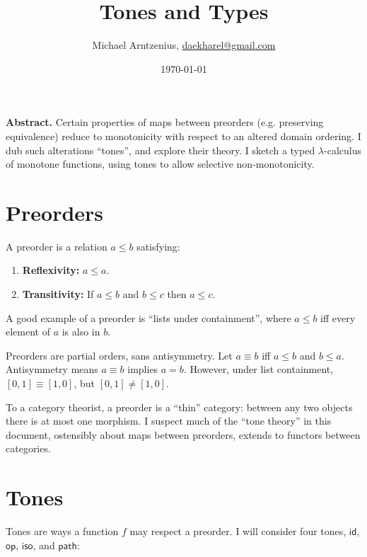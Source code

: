 \documentclass[b5,wide,libertine,ribbons]{rntz}
\title{Tones and Types}
\author{Michael Arntzenius, %
  \href{mailto:daekharel@gmail.com}{daekharel@gmail.com}}
\date{\today}
\newcommand{\ms}[1]{\ensuremath{\mathsf{#1}}}
\newcommand{\id}{\ms{id}}
\newcommand{\op}{\ms{op}}
\newcommand{\iso}{\ms{iso}}     %
\renewcommand{\path}{\ms{path}} %
\newcommand{\tm}{\id}                   %
\newcommand{\ta}{{\color{ACMGreen}\op}} %
\newcommand{\ti}{{\color{ACMBlue}\iso}} %
\newcommand{\tb}{{\color{ACMRed}\path}} %
\renewcommand{\ta}{{\color{ForestGreen}\op}}   %
\renewcommand{\ti}{{\color{NavyBlue}\iso}}     %
\renewcommand{\tb}{{\color{Bittersweet}\path}} %
\begin{document}
\maketitle

{\vspace{1em}%
\textbf{Abstract.}
%
 Certain properties of maps between preorders (e.g.\! preserving equivalence)
 reduce to monotonicity with respect to an altered domain ordering. I dub such
 alterations ``tones'', and explore their theory. I sketch a typed
 $\lambda$-calculus of monotone functions, using tones to allow selective
 non-mono\-tonicity. \par}

\section{Preorders}

A preorder is a relation $a \le b$ satisfying:
\begin{enumerate}
\item \textbf{Reflexivity:} $a \le a$.
\item \textbf{Transitivity:} If $a \le b$ and $b \le c$ then $a \le c$.
\end{enumerate}

A good example of a preorder is ``lists under containment'', where $a \le b$ iff
every element of $a$ is also in $b$.

Preorders are partial orders, sans antisymmetry. Let $a \equiv b$ iff $a \le b$
and $b \le a$. Antisymmetry means $a \equiv b$ implies $a = b$. However, under
list containment, $[0,1] \equiv [1,0]$, but $[0,1] \ne [1,0]$.

To a category theorist, a preorder is a ``thin'' category: between any two
objects there is at most one morphism. I suspect much of the ``tone theory'' in
this document, ostensibly about maps between preorders, extends to functors
between categories.


\section{Tones}\label{sec:tones}

Tones are ways a function $f$ may respect a preorder. I will consider four
tones, \tm, \ta, \ti, and \tb:
\end{document}
